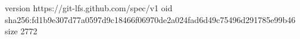 version https://git-lfs.github.com/spec/v1
oid sha256:fd1b9e307d77a0597d9c18466f06970de2a024fad6d49c75496d291785e99b46
size 2772
